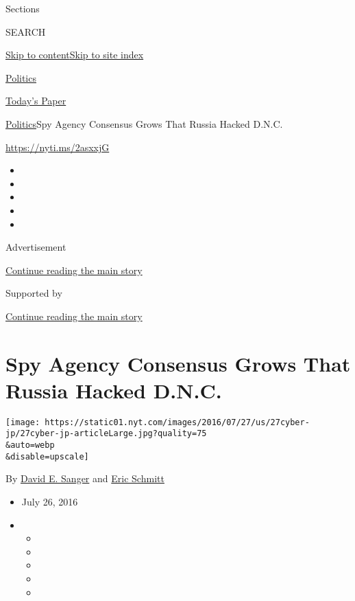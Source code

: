 Sections

SEARCH

\protect\hyperlink{site-content}{Skip to
content}\protect\hyperlink{site-index}{Skip to site index}

\href{https://www.nytimes.com/section/politics}{Politics}

\href{https://myaccount.nytimes.com/auth/login?response_type=cookie\&client_id=vi}{}

\href{https://www.nytimes.com/section/todayspaper}{Today's Paper}

\href{/section/politics}{Politics}\textbar{}Spy Agency Consensus Grows
That Russia Hacked D.N.C.

\url{https://nyti.ms/2asxxjG}

\begin{itemize}
\item
\item
\item
\item
\item
\end{itemize}

Advertisement

\protect\hyperlink{after-top}{Continue reading the main story}

Supported by

\protect\hyperlink{after-sponsor}{Continue reading the main story}

\hypertarget{spy-agency-consensus-grows-that-russia-hacked-dnc}{%
\section{Spy Agency Consensus Grows That Russia Hacked
D.N.C.}\label{spy-agency-consensus-grows-that-russia-hacked-dnc}}

\texttt{[image: https://static01.nyt.com/images/2016/07/27/us/27cyber-jp/27cyber-jp-articleLarge.jpg?quality=75\\\&auto=webp\\\&disable=upscale]}

By \href{http://www.nytimes.com/by/david-e-sanger}{David E. Sanger} and
\href{http://www.nytimes.com/by/eric-schmitt}{Eric Schmitt}

\begin{itemize}
\item
  July 26, 2016
\item
  \begin{itemize}
  \item
  \item
  \item
  \item
  \item
  \end{itemize}
\end{itemize}

